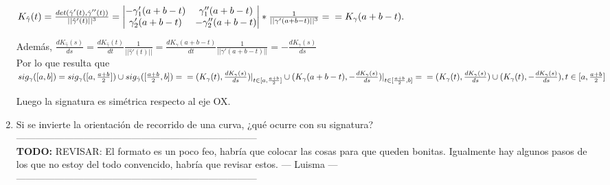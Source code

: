 \documentclass[12pt,a4paper]{article}
\newcommand{\todo}[1]{{\large \color{red} \textbf{TODO: }#1 }}
\begin{document}
\begin{enumerate}
  $K_{\hat{\gamma}}(t) = \frac{det(\hat{\gamma}'(t),
    \hat{\gamma}''(t))}{||\hat{\gamma}'(t)||^{3}} = 
  \begin{vmatrix}
    -\gamma_{1}'(a+b-t) & \gamma_{1}''(a+b-t) \\
    \gamma_{2}'(a+b-t) & -\gamma_{2}''(a+b-t) 
  \end{vmatrix} * \frac{1}{||\gamma'(a+b-t)||^{3}} =\\ =K_{\gamma}(a+b-t).$

  Además, $\frac{dK_{\hat{\gamma}}(s)}{ds} =
  \frac{dK_{\hat{\gamma}}(t)}{dt} \frac{1}{||\hat{\gamma}'(t)||} =
  \frac{dK_{\gamma}(a+b-t)}{dt} \frac{1}{||\gamma'(a+b-t)||} = -
  \frac{dK_\gamma(s)}{ds}$\\

  Por lo que resulta que\\
  $sig_{\gamma}([a,b]) = sig_{\gamma}([a,
  \frac{a+b}{2}]) \cup sig_{\hat{\gamma}}([\frac{a+b}{2}, b]) = \\=
  (K_{\gamma}(t), \frac{dK_{\gamma}(s)}{ds})|_{t\in[a, \frac{a+b}{2}]} \cup
  (K_{\gamma}(a+b-t), - \frac{dK_{\gamma}(s)}{ds})|_{t\in[\frac{a+b}{2},
    b]} =\\= (K_{\gamma}(t), \frac{dK_{\gamma}(s)}{ds}) \cup
  (K_{\gamma}(t), - \frac{dK_{\gamma}(s)}{ds}), t\in[a, \frac{a+b}{2}]$
  
  Luego la signatura es simétrica respecto al eje OX.\\


  
\item Si se invierte la orientación de recorrido de una curva, ¿qué ocurre
  con su signatura?\\
  ---------------------------------------------------------------------------\\
  \todo{REVISAR: El formato es un poco feo, habría que colocar las cosas
    para que queden bonitas. Igualmente hay algunos pasos de los que no
    estoy del todo convencido, habría que revisar estos. \tiny --- Luisma ---}\\
  ---------------------------------------------------------------------------
  

\end{enumerate}
\end{document}
